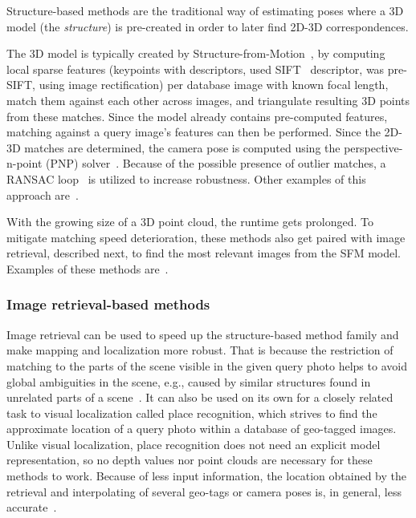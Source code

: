 Structure-based methods are the traditional way of estimating poses where a 3D model (the \emph{structure}) is
pre-created in order to later find 2D-3D correspondences.

The 3D model is typically created by
Structure-from-Motion~\citep{SfM, schoenberger2016mvs}, by computing local sparse features (keypoints with descriptors,
\citet{LoweLocalization} used SIFT~\citep{SIFT} descriptor, \citet{PreSIFT} was pre-SIFT, using image rectification)
per database image with known focal length, match them against each other across images, and triangulate resulting 3D points
from these matches. Since the model already contains pre-computed features, matching against
a query image's features can then be performed. Since the 2D-3D matches are determined, the camera pose
is computed using the perspective-n-point (PNP) solver~\citep{PnP}. Because of the possible presence of outlier matches,
a RANSAC loop~\citep{RANSAC} is utilized to increase robustness. Other examples of this approach are~\citet{2D3D, 2D3D_2}.

With the growing size of a 3D point cloud, the runtime gets prolonged. To mitigate matching speed deterioration,
these methods also get paired with image retrieval, described next, to find the most
relevant images from the SFM model. Examples of these methods
are~\citet{InLoc, InLocRevisited, MegLoc}.

\subsubsection*{Image retrieval-based methods}

Image retrieval can be used to speed up the structure-based method family and make mapping
and localization more robust. That is because the restriction of matching to the parts of the scene visible in the given query photo
helps to avoid global ambiguities in the scene, e.g., caused by similar structures found in unrelated parts
of a scene~\citep{InLocRevisited}. It can also be used on its own for a closely related task to visual
localization called place recognition, which strives to find the approximate location of a query photo within a database
of geo-tagged images. Unlike visual localization, place recognition
does not need an explicit model representation, so no depth values nor point clouds are necessary for these
methods to work. Because of less input information, the location obtained by the retrieval and interpolating of several geo-tags
or camera poses is, in general, less accurate~\citep{InterpolationRetrieval, RegressionPose}.

